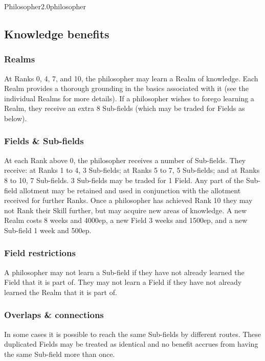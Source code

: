 \begin{skill}{Philosopher}{2.0}{philosopher}
\subsection{Knowledge benefits}

\subsubsection{Realms}

At Ranks 0, 4, 7, and 10, the philosopher may learn a Realm of
knowledge.  Each Realm provides a thorough grounding in the basics
associated with it (see the individual Realms for more details).  If a
philosopher wishes to forego learning a Realm, they receive an extra 8
Sub-fields (which may be traded for Fields as below).

\subsubsection{Fields \& Sub-fields}

At each Rank above 0, the philosopher receives a number of Sub-fields.
They receive: at Ranks 1 to 4, 3 Sub-fields; at Ranks 5 to 7, 5
Sub-fields; and at Ranks 8 to 10, 7 Sub-fields. 3 Sub-fields may be
traded for 1 Field. Any part of the Sub-field allotment may be
retained and used in conjunction with the allotment received for
further Ranks. Once a philosopher has achieved Rank 10 they may not
Rank their Skill further, but may acquire new areas of knowledge. A
new Realm costs 8 weeks and 4000ep, a new Field 3 weeks and 1500ep,
and a new Sub-field 1 week and 500ep.

\subsubsection{Field restrictions}

A philosopher may not learn a Sub-field if they have not already
learned the Field that it is part of. They may not learn a Field if
they have not already learned the Realm that it is part of.

\subsubsection{Overlaps \& connections}

In some cases it is possible to reach the same Sub-fields by different
routes.  These duplicated Fields may be treated as identical and no
benefit accrues from having the same Sub-field more than once.


\end{skill}

